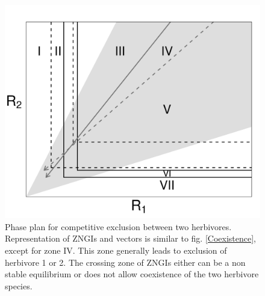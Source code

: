 \documentclass[12pt]{article}
\begin{document}
\begin{figure}[h]
\includegraphics[width=16 cm, keepaspectratio]{Exclusion2Herbivores}
\caption{Phase plan for competitive exclusion between two herbivores. Representation of ZNGIs and vectors is similar to fig. \ref{Coexistence}, except for zone IV. This zone generally leads to exclusion of herbivore 1 or 2. The crossing zone of ZNGIs either can be a non stable equilibrium  or does not allow coexistence of the two herbivore species. }
\label{Exclusion}
\end{figure}
\end{document}
